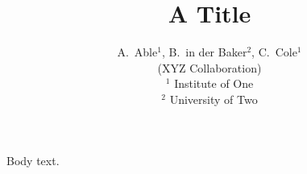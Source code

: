 \documentclass[aps,prd,twocolumn]{revtex4-1}
\begin{document}
\title{A Title}
\author{A.~Able$^{1}$, B.~in der Baker$^{2}$, C.~Cole$^{1}$\\
(XYZ Collaboration)\\
$^{1}$ Institute of One\\
$^{2}$ University of Two}
\maketitle
Body text.
\end{document}
